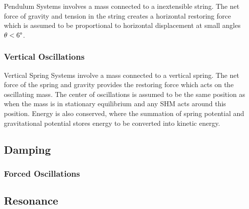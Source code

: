 \documentclass[../main]{subfiles}
\begin{document}
Pendulum Systems involves a mass connected to a inextensible string. The net force of gravity and tension in the string creates a horizontal restoring force which is assumed to be proportional to horizontal displacement at small angles \(\theta < 6 \degree \). 

\subsubsection{Vertical Oscillations}

Vertical Spring Systems involve a mass connected to a vertical spring. The net force of the spring and gravity provides the restoring force which acts on the oscillating mass. The center of oscillations is assumed to be the same position as when the mass is in stationary equilibrium and any SHM acts around this position. Energy is also conserved, where the summation of spring potential and gravitational potential stores energy to be converted into kinetic energy.

\subsection{Damping}





\subsubsection{Forced Oscillations}


\subsection{Resonance}
\end{document}
